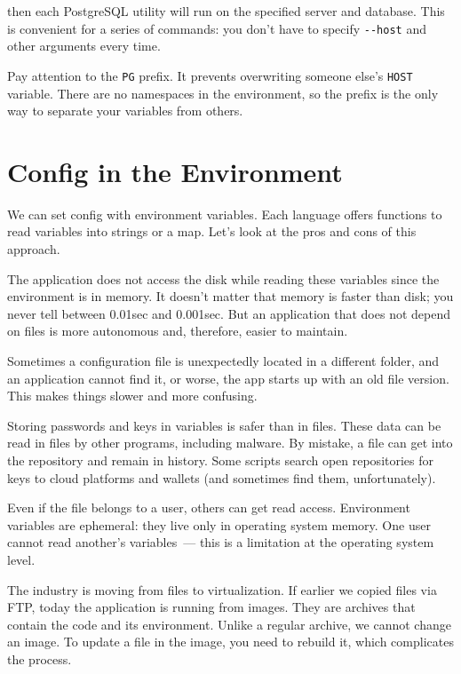 \fi

\noindent
then each PostgreSQL utility will run on the specified server and database. This is convenient for a series of commands: you don't have to specify \verb|--host| and other arguments every time.

Pay attention to the \verb|PG| prefix. It prevents overwriting someone else's \verb|HOST| variable. There are no namespaces in the environment, so the prefix is the only way to separate your variables from others.

\section{Config in the Environment}

We can set config with environment variables. Each language offers functions to read variables into strings or a map. Let's look at the pros and cons of this approach.

The application does not access the disk while reading these variables since the environment is in memory. It doesn't matter that memory is faster than disk; you never tell between 0.01sec and 0.001sec. But an application that does not depend on files is more autonomous and, therefore, easier to maintain.

Sometimes a configuration file is unexpectedly located in a different folder, and an application cannot find it, or worse, the app starts up with an old file version. This makes things slower and more confusing.

\label{password-note}


Storing passwords and keys in variables is safer than in files. These data can be read in files by other programs, including malware. By mistake, a file can get into the repository and remain in history. Some scripts search open repositories for keys to cloud platforms and wallets (and sometimes find them, unfortunately).

Even if the file belongs to a user, others can get read access. Environment variables are ephemeral: they live only in operating system memory. One user cannot read another's variables~--- this is a limitation at the operating system level.


The industry is moving from files to virtualization. If earlier we copied files via FTP, today the application is running from images. They are archives that contain the code and its environment. Unlike a regular archive, we cannot change an image. To update a file in the image, you need to rebuild it, which complicates the process.

